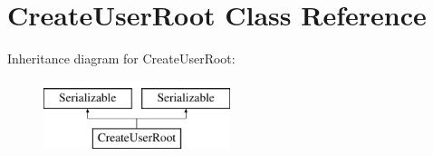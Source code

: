 \hypertarget{class_create_user_root}{}\section{Create\+User\+Root Class Reference}
\label{class_create_user_root}
Inheritance diagram for Create\+User\+Root\+:\begin{figure}[H]
\begin{center}
\leavevmode
\includegraphics[height=2.000000cm]{class_create_user_root}
\end{center}
\end{figure}

